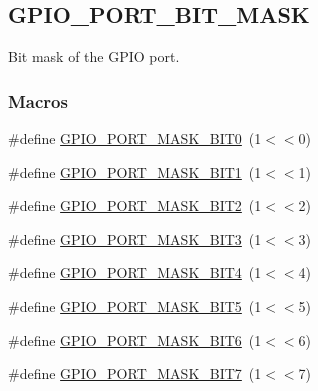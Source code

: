 \hypertarget{group___g_p_i_o___p_o_r_t___b_i_t___m_a_s_k}{}\subsection{G\+P\+I\+O\+\_\+\+P\+O\+R\+T\+\_\+\+B\+I\+T\+\_\+\+M\+A\+SK}
\label{group___g_p_i_o___p_o_r_t___b_i_t___m_a_s_k}


Bit mask of the G\+P\+IO port.  


\subsubsection*{Macros}
\begin{DoxyCompactItemize}
\item 
\#define \hyperlink{group___g_p_i_o___p_o_r_t___b_i_t___m_a_s_k_ga75615fa6b95035288298177035593e88}{G\+P\+I\+O\+\_\+\+P\+O\+R\+T\+\_\+\+M\+A\+S\+K\+\_\+\+B\+I\+T0}~(1$<$$<$0)
\item 
\#define \hyperlink{group___g_p_i_o___p_o_r_t___b_i_t___m_a_s_k_ga15669e8bb68ba89b56139b0310c5b6fe}{G\+P\+I\+O\+\_\+\+P\+O\+R\+T\+\_\+\+M\+A\+S\+K\+\_\+\+B\+I\+T1}~(1$<$$<$1)
\item 
\#define \hyperlink{group___g_p_i_o___p_o_r_t___b_i_t___m_a_s_k_ga23cb6cd637ec9dcd8e8d714d2ee2b229}{G\+P\+I\+O\+\_\+\+P\+O\+R\+T\+\_\+\+M\+A\+S\+K\+\_\+\+B\+I\+T2}~(1$<$$<$2)
\item 
\#define \hyperlink{group___g_p_i_o___p_o_r_t___b_i_t___m_a_s_k_ga38f6cc5206cbd9bf7485a422333c3fe9}{G\+P\+I\+O\+\_\+\+P\+O\+R\+T\+\_\+\+M\+A\+S\+K\+\_\+\+B\+I\+T3}~(1$<$$<$3)
\item 
\#define \hyperlink{group___g_p_i_o___p_o_r_t___b_i_t___m_a_s_k_ga05868e072e90c6be38d253ceb404feb6}{G\+P\+I\+O\+\_\+\+P\+O\+R\+T\+\_\+\+M\+A\+S\+K\+\_\+\+B\+I\+T4}~(1$<$$<$4)
\item 
\#define \hyperlink{group___g_p_i_o___p_o_r_t___b_i_t___m_a_s_k_gab4913e504a5bcf0f9a1f767f20a17318}{G\+P\+I\+O\+\_\+\+P\+O\+R\+T\+\_\+\+M\+A\+S\+K\+\_\+\+B\+I\+T5}~(1$<$$<$5)
\item 
\#define \hyperlink{group___g_p_i_o___p_o_r_t___b_i_t___m_a_s_k_ga7c99dfdfc726da165b139173e8bfbb9c}{G\+P\+I\+O\+\_\+\+P\+O\+R\+T\+\_\+\+M\+A\+S\+K\+\_\+\+B\+I\+T6}~(1$<$$<$6)
\item 
\#define \hyperlink{group___g_p_i_o___p_o_r_t___b_i_t___m_a_s_k_ga3f5f5c424d353433c3806ca524712946}{G\+P\+I\+O\+\_\+\+P\+O\+R\+T\+\_\+\+M\+A\+S\+K\+\_\+\+B\+I\+T7}~(1$<$$<$7)
\end{DoxyCompactItemize}


